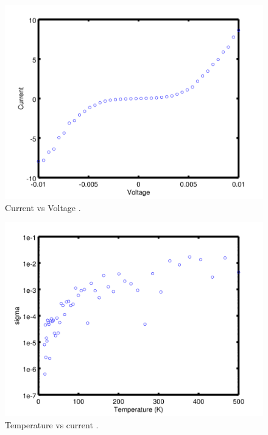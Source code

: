 \begin{figure}[htbp]
\begin{center}
\includegraphics[scale=.50]{VvJ.png}
\caption{Current vs Voltage .}
\label{JvsV}
\end{center}
\end{figure}

\begin{figure}[htbp]
\begin{center}
\includegraphics[scale=.50]{jvt.png}
\caption{Temperature vs current .}
\label{TvJ}
\end{center}
\end{figure}


